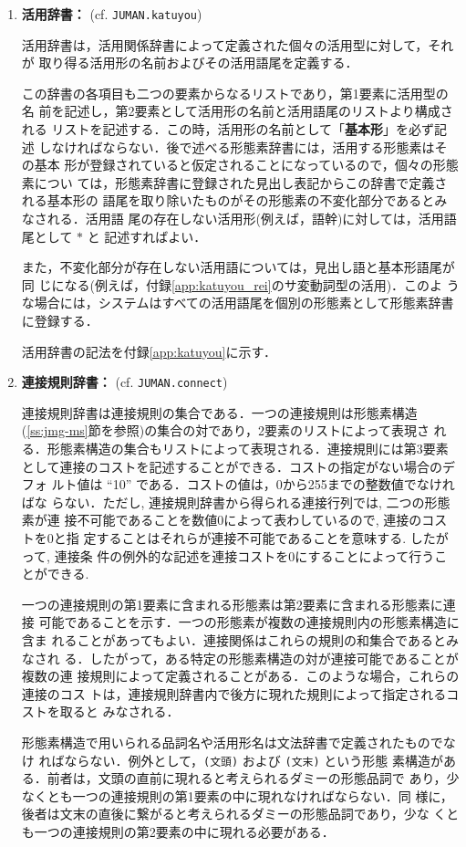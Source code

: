 \documentclass[a4j,titlepage]{jarticle}
\begin{document}
\begin{enumerate}
\item\label{local:k_dict}
{\bf 活用辞書：} (cf. {\tt JUMAN.katuyou})

活用辞書は，活用関係辞書によって定義された個々の活用型に対して，それが
取り得る活用形の名前およびその活用語尾を定義する．

この辞書の各項目も二つの要素からなるリストであり，第1要素に活用型の名
前を記述し，第2要素として活用形の名前と活用語尾のリストより構成される
リストを記述する．この時，活用形の名前として「{\bf 基本形}」を必ず記述
しなければならない．後で述べる形態素辞書には，活用する形態素はその基本
形が登録されていると仮定されることになっているので，個々の形態素につい
ては，形態素辞書に登録された見出し表記からこの辞書で定義される基本形の
語尾を取り除いたものがその形態素の不変化部分であるとみなされる．活用語
尾の存在しない活用形(例えば，語幹)に対しては，活用語尾として $\ast$ と
記述すればよい．

また，不変化部分が存在しない活用語については，見出し語と基本形語尾が同
じになる(例えば，付録\ref{app:katuyou_rei}のサ変動詞型の活用)．このよ
うな場合には，システムはすべての活用語尾を個別の形態素として形態素辞書
に登録する．

活用辞書の記法を付録\ref{app:katuyou}に示す．

\item\label{local:c_dict}
{\bf 連接規則辞書：} (cf. {\tt JUMAN.connect})

連接規則辞書は連接規則の集合である．一つの連接規則は形態素構造
(\ref{ss:jmg-ms}節を参照)の集合の対であり，2要素のリストによって表現さ
れる．形態素構造の集合もリストによって表現される．連接規則には第3要素
として連接のコストを記述することができる．コストの指定がない場合のデフォ
ルト値は ``10'' である．コストの値は，0から255までの整数値でなければな
らない．ただし, 連接規則辞書から得られる連接行列では, 二つの形態素が連
接不可能であることを数値0によって表わしているので, 連接のコストを0と指
定することはそれらが連接不可能であることを意味する. したがって, 連接条
件の例外的な記述を連接コストを0にすることによって行うことができる.

一つの連接規則の第1要素に含まれる形態素は第2要素に含まれる形態素に連接
可能であることを示す．一つの形態素が複数の連接規則内の形態素構造に含ま
れることがあってもよい．連接関係はこれらの規則の和集合であるとみなされ
る．したがって，ある特定の形態素構造の対が連接可能であることが複数の連
接規則によって定義されることがある．このような場合，これらの連接のコス
トは，連接規則辞書内で後方に現れた規則によって指定されるコストを取ると
みなされる．

形態素構造で用いられる品詞名や活用形名は文法辞書で定義されたものでなけ
ればならない．例外として，{\tt (文頭)} および {\tt (文末)} という形態
素構造がある．前者は，文頭の直前に現れると考えられるダミーの形態品詞で
あり，少なくとも一つの連接規則の第1要素の中に現れなければならない．同
様に，後者は文末の直後に繋がると考えられるダミーの形態品詞であり，少な
くとも一つの連接規則の第2要素の中に現れる必要がある．


\end{enumerate}
\end{document}
